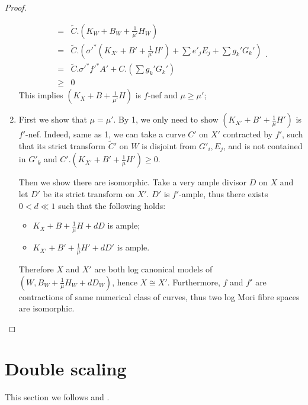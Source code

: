 \documentclass{article}
\begin{document}
\begin{proof}
\begin{enumerate}
\[\begin{aligned}
          =&\tilde{C}.\left(K_W+B_W+\frac{1}{\mu'}H_W\right)\\
          =&\tilde{C}.\left(\sigma'^*\left(K_{X'}+B'+\frac{1}{\mu'}H'\right)+\sum e'_jE_j+ \sum g_k'G_k'\right)\\
          =&\tilde{C}.\sigma'^*f'^*A'+C.\left(\sum g_k'G_k'\right)\\
          \geqslant&0
        \end{aligned}
      .\]
     This implies $ (K_X+B+\frac{1}{\mu'}H) $ is $ f $-nef and $ \mu\geqslant \mu' $;
   \item  First we show that $ \mu=\mu' $. By 1, we only need to show $ (K_{X'}+B'+\frac{1}{\mu}H') $ is $ f' $-nef. Indeed,  same as 1, we can take a curve $ C' $ on $X'$ contracted by $f'$, such that its strict transform $\tilde{C}'$ on $W$ is disjoint from  $ G'_i, E_j $, and is not contained in $ G'_k $ and 
     $C'.\left(K_{X'}+B'+\frac{1}{\mu}H'\right)\geqslant 0$.

Then we show there are isomorphic. Take a very ample divisor $ D $ on $ X $ and let $ D'  $ be its strict transform on $ X' $. $ D' $ is $ f' $-ample, thus there exists $ 0<d\ll1 $ such that the following holds:
      \begin{itemize}
        \item $ K_X+B+\frac{1}{\mu }H+dD $ is ample;
        \item $ K_{X'}+B'+\frac{1}{\mu }H'+dD' $ is ample.
      \end{itemize}
  Therefore $X$ and $X'$ are both log canonical models of $(W,B_{W}+\frac{1}{\mu}H_{W}+dD_{W})$, hence $X\cong X'$. Furthermore, $f$ and  $f'$ are contractions of same numerical class of curves, thus two log Mori fibre spaces are isomorphic.
\end{enumerate}
\end{proof}

\section{Double scaling}
This section we follows \cite[13.The Sarkisov program]{haconMinimalModelProgram2012} and  \cite{liuSarkisovProgramGeneralized2021}.
\end{document}
